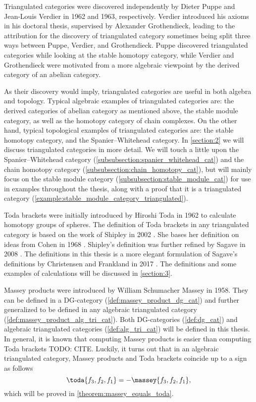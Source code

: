 Triangulated categories were discovered independently by Dieter Puppe and Jean-Louis Verdier in 1962 and 1963, respectively. Verdier introduced his axioms in his doctoral thesis, supervised by Alexander Grothendieck, leading to the attribution for the discovery of triangulated category sometimes being split three ways between Puppe, Verdier, and Grothendieck. Puppe discovered triangulated categories while looking at the stable homotopy category, while Verdier and Grothendieck were motivated from a more algebraic viewpoint by the derived category of an abelian category.

As their discovery would imply, triangulated categories are useful in both algebra and topology. Typical algebraic examples of triangulated categories are: the derived categories of abelian category as mentioned above, the stable module category, as well as the homotopy category of chain complexes. On the other hand, typical topological examples of triangulated categories are: the stable homotopy category, and the Spanier--Whitehead category. In \autoref{section:2} we will discuss triangulated categories in more detail. We will touch a little upon the Spanier--Whitehead category (\autoref{subsubsection:spanier_whitehead_cat}) and the chain homotopy category (\autoref{subsubsection:chain_homotopy_cat}), but will mainly focus on the stable module category (\autoref{subsubsection:stable_module_cat}) for use in examples throughout the thesis, along with a proof that it is a triangulated category (\autoref{example:stable_module_category_triangulated}).

Toda brackets were initially introduced by Hiroshi Toda in 1962 to calculate homotopy groups of spheres. The definition of Toda brackets in any triangulated category is based on the work of Shipley in 2002 \cite[Definition A.2]{Shipley_2002}. She bases her definition on ideas from Cohen in 1968 \cite[p. 308]{Cohen_1968}. Shipley's definition was further refined by Sagave in 2008 \cite[Remark 4.5]{Sagave_2008}. The definitions in this thesis is a more elegant formulation of Sagave's definitions by Christensen and Frankland in 2017 \cite[Definition 3.1]{Christensen-Frankland_2017}. The definitions and some examples of calculations will be discussed in \autoref{section:3}.

Massey products were introduced by William Schumacher Massey in 1958. They can be defined in a DG-category (\autoref{def:massey_product_dg_cat}) and further generalized to be defined in any algebraic triangulated category (\autoref{def:massey_product_alg_tri_cat}). Both DG-categories (\autoref{def:dg_cat}) and algebraic triangulated categories (\autoref{def:alg_tri_cat}) will be defined in this thesis. In general, it is known that computing Massey products is easier than computing Toda brackets TODO: CITE. Luckily, it turns out that in an algebraic triangulated category, Massey products and Toda brackets coincide up to a sign as follows
\[
    \toda{f_3, f_2, f_1} = -\massey{f_3, f_2, f_1},
\]
which will be proved in \autoref{theorem:massey_equals_toda}.

